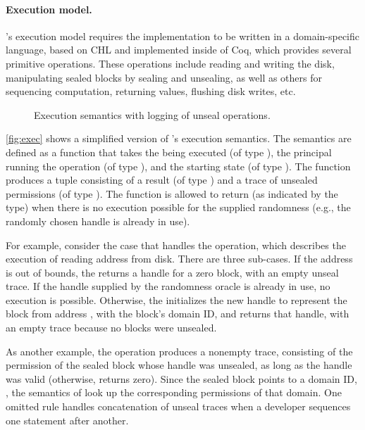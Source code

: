 \paragraph{Execution model.}

\sys's execution model requires the implementation to be written in a
domain-specific language, based on CHL and implemented inside of Coq,
which provides several primitive operations.  These operations include
reading and writing the disk, manipulating sealed blocks by sealing and
unsealing, as well as others for sequencing computation, returning values,
flushing disk writes, etc.

\begin{figure}[ht]
  
  \caption{Execution semantics with logging of unseal operations.}
  \label{fig:exec}
\end{figure}

\autoref{fig:exec} shows a simplified version of \sys's execution
semantics.  The semantics are defined as a function that takes the
 being executed (of type ), the principal 
running the operation (of type ), and the starting state 
(of type ).  The function
produces a tuple consisting of a result (of type ) and
a trace of unsealed permissions (of type ).  The function
is allowed to return  (as indicated by the  type)
when there is no execution possible for the supplied randomness (e.g.,
the randomly chosen handle is already in use).

For example, consider the case that handles the  operation,
which describes the execution of reading address  from disk.
There are three sub-cases.  If the address is out of bounds, the 
returns a handle for a zero block, with an empty unseal trace.  If the handle
 supplied by the randomness oracle is already in use, no execution
is possible.  Otherwise, the  initializes the new handle to
represent the block from address , with the block's domain ID, and
returns that handle, with an empty trace because no blocks were unsealed.

As another example, the  operation produces a nonempty trace,
consisting of the permission of the sealed block whose handle 
was unsealed, as long as the handle was valid (otherwise, 
returns zero).  Since the sealed block points to a domain ID, ,
the semantics of  look up the corresponding permissions of
that domain.  One omitted rule handles concatenation of unseal traces when a
developer sequences one statement after another.

